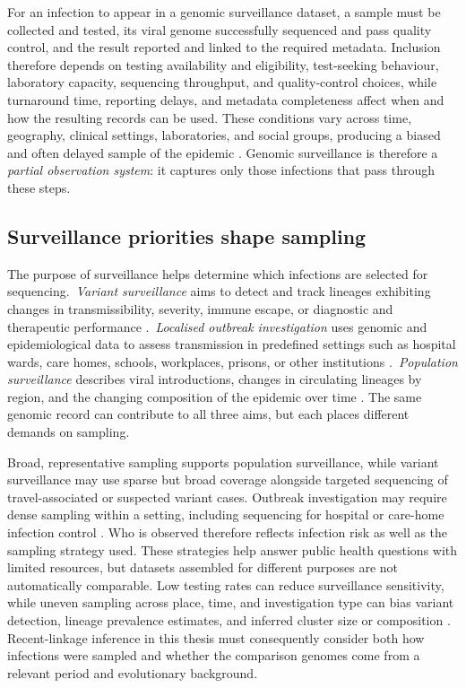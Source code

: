 For an infection to appear in a genomic surveillance dataset, a sample must be collected and tested, its viral genome successfully sequenced and pass quality control, and the result reported and linked to the required metadata. Inclusion therefore depends on testing availability and eligibility, test-seeking behaviour, laboratory capacity, sequencing throughput, and quality-control choices, while turnaround time, reporting delays, and metadata completeness affect when and how the resulting records can be used. These conditions vary across time, geography, clinical settings, laboratories, and social groups, producing a biased and often delayed sample of the epidemic \citep{Chen2022,Han2023,Brito2022}. Genomic surveillance is therefore a \emph{partial observation system}: it captures only those infections that pass through these steps.

\subsection{Surveillance priorities shape sampling}\label{sec:ch2_surveillance_priorities}

The purpose of surveillance helps determine which infections are selected for sequencing.\ \emph{Variant surveillance} aims to detect and track lineages exhibiting changes in transmissibility, severity, immune escape, or diagnostic and therapeutic performance \citep{WHO2021,ECDC2021,OudeMunnink2021}.\ \emph{Localised outbreak investigation} uses genomic and epidemiological data to assess transmission in predefined settings such as hospital wards, care homes, schools, workplaces, prisons, or other institutions \citep{Meredith2020,Hamilton2021,Aggarwal2022,Sekizuka2020,Reichert2022,Adamson2022}.\ \emph{Population surveillance} describes viral introductions, changes in circulating lineages by region, and the changing composition of the epidemic over time \citep{daSilvaFilipe2020,duPlessis2021,Lycett2021,Vohringer2021}. The same genomic record can contribute to all three aims, but each places different demands on sampling.

Broad, representative sampling supports population surveillance, while variant surveillance may use sparse but broad coverage alongside targeted sequencing of travel-associated or suspected variant cases. Outbreak investigation may require dense sampling within a setting, including sequencing for hospital or care-home infection control \citep{WHO2021,ECDC2021,OudeMunnink2021,Inward2022}. Who is observed therefore reflects infection risk as well as the sampling strategy used. These strategies help answer public health questions with limited resources, but datasets assembled for different purposes are not automatically comparable. Low testing rates can reduce surveillance sensitivity, while uneven sampling across place, time, and investigation type can bias variant detection, lineage prevalence estimates, and inferred cluster size or composition \citep{Suster2022,Han2023}. Recent-linkage inference in this thesis must consequently consider both how infections were sampled and whether the comparison genomes come from a relevant period and evolutionary background.

